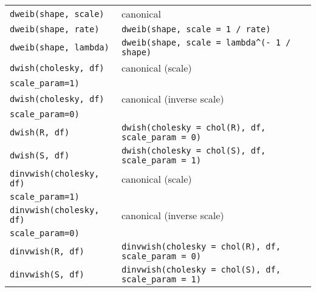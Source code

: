 \begin{center}
\begin{longtable}{ll}
     \texttt{dweib(shape, scale)} & canonical \\
     \texttt{dweib(shape, rate)} & \verb|dweib(shape, scale = 1 / rate)| \\
     \texttt{dweib(shape, lambda)} & \verb|dweib(shape, scale = lambda^(- 1 / shape)| \\
     \texttt{dwish(cholesky, df)} & canonical (scale) \\
       \hspace{5mm}\texttt{scale\_param=1)}          & \\
     \texttt{dwish(cholesky, df)} & canonical (inverse scale) \\
       \hspace{5mm}\texttt{scale\_param=0)}          & \\
     \texttt{dwish(R, df)} & \texttt{dwish(cholesky = chol(R), df, scale\_param = 0)}\\ 
     \texttt{dwish(S, df)} & \texttt{dwish(cholesky = chol(S), df, scale\_param = 1)}\\ 
     \texttt{dinvwish(cholesky, df)} & canonical (scale) \\
       \hspace{5mm}\texttt{scale\_param=1)}          & \\
     \texttt{dinvwish(cholesky, df)} & canonical (inverse scale) \\
       \hspace{5mm}\texttt{scale\_param=0)}          & \\
     \texttt{dinvwish(R, df)} & \texttt{dinvwish(cholesky = chol(R), df, scale\_param = 0)}\\
     \texttt{dinvwish(S, df)} & \texttt{dinvwish(cholesky = chol(S), df, scale\_param = 1)}\\
     \end{longtable}
  \end{center}
